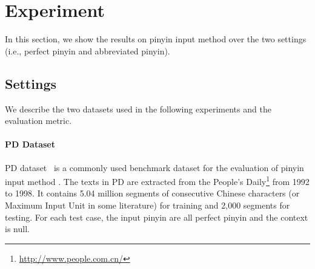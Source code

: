 


\section{Experiment}


In this section, we show the results 
on  pinyin input method over the two settings (i.e., perfect pinyin and abbreviated pinyin).


\subsection{Settings}
We describe the two datasets used in the following experiments and the evaluation metric.

\paragraph{PD Dataset} PD dataset~\cite{yang-etal-2012-towards} is a commonly used benchmark dataset for the evaluation of pinyin input method \cite{jia-zhao-2014-joint,zhang-etal-arxiv-tracing,huang-etal-2018-moon,zhang-etal-2019-open}. 
The texts in PD are extracted from the People’s Daily\footnote{\url{http://www.people.com.cn/}} from 1992 to 1998.
It contains 5.04 million segments of consecutive Chinese characters (or Maximum Input Unit in some literature) for training and 2,000 segments for testing.
For each test case, the input pinyin are all perfect pinyin and the context is null.

